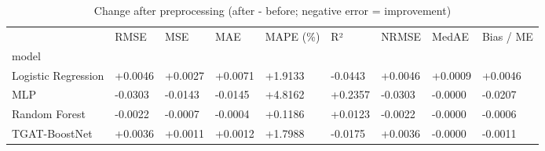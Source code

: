 \begin{table}
\caption{Change after preprocessing (after - before; negative error = improvement)}
\label{tab:01_before_after_change}
\begin{tabular}{lllllllll}
\toprule
 & RMSE & MSE & MAE & MAPE (\%) & R² & NRMSE & MedAE & Bias / ME \\
model &  &  &  &  &  &  &  &  \\
\midrule
Logistic Regression & +0.0046 & +0.0027 & +0.0071 & +1.9133 & -0.0443 & +0.0046 & +0.0009 & +0.0046 \\
MLP & -0.0303 & -0.0143 & -0.0145 & +4.8162 & +0.2357 & -0.0303 & -0.0000 & -0.0207 \\
Random Forest & -0.0022 & -0.0007 & -0.0004 & +0.1186 & +0.0123 & -0.0022 & -0.0000 & -0.0006 \\
TGAT-BoostNet & +0.0036 & +0.0011 & +0.0012 & +1.7988 & -0.0175 & +0.0036 & -0.0000 & -0.0011 \\
\bottomrule
\end{tabular}
\end{table}
